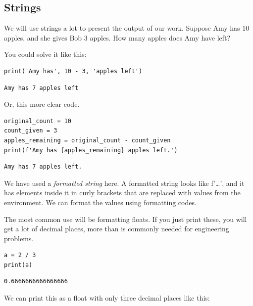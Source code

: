 \documentclass[11pt]{article}
\begin{document}
\subsection{Strings}
\label{sec:org5889624}

We will use strings a lot to present the output of our work. Suppose Amy has 10 apples, and she gives Bob 3 apples. How many apples does Amy have left?

You could solve it like this:

\begin{verbatim}
print('Amy has', 10 - 3, 'apples left')
\end{verbatim}

\begin{verbatim}
Amy has 7 apples left

\end{verbatim}

Or, this more clear code.

\begin{verbatim}
original_count = 10
count_given = 3
apples_remaining = original_count - count_given
print(f'Amy has {apples_remaining} apples left.')
\end{verbatim}

\begin{verbatim}
Amy has 7 apples left.

\end{verbatim}

We have used a \emph{formatted string} here. A formatted string looks like f'\ldots{}', and it has elements inside it in curly brackets that are replaced with values from the environment. We can format the values using formatting codes.

The most common use will be formatting floats. If you just print these, you will get a lot of decimal places, more than is commonly needed for engineering problems.

\begin{verbatim}
a = 2 / 3
print(a)
\end{verbatim}

\begin{verbatim}
0.6666666666666666

\end{verbatim}

We can print this as a float with only three decimal places like this:
\end{document}
